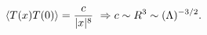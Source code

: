 \begin{equation}
\langle T(x) T(0)\rangle = {c\over |x|^8}\,\,\Rightarrow c\sim R^3\sim (\Lambda )^{-3/2}.
\label{scaling}
\end{equation}

